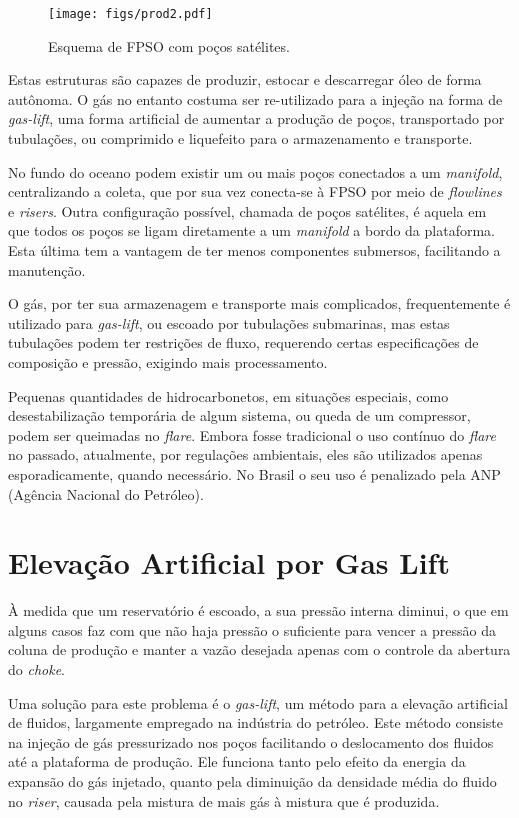 \begin{figure}
\centering
  \texttt{[image: figs/prod2.pdf]}
  \caption{Esquema de FPSO com poços satélites.}
  \label{fig:fpso1}
\end{figure}





Estas estruturas são capazes de produzir, estocar e descarregar óleo de forma autônoma. O gás no entanto costuma ser re-utilizado para a injeção na forma de \textit{gas-lift}, uma forma artificial de aumentar a produção de poços, transportado por tubulações, ou comprimido e liquefeito para o armazenamento e transporte.

No fundo do oceano podem existir um ou mais poços conectados a um \textit{manifold}, centralizando a coleta, que por sua vez conecta-se à FPSO por meio de \textit{flowlines} e \textit{risers}. Outra configuração possível, chamada de poços satélites, é aquela em que todos os poços se ligam diretamente a um \textit{manifold} a bordo da plataforma. Esta última tem a vantagem de ter menos componentes submersos, facilitando a manutenção.


O gás, por ter sua armazenagem e transporte mais complicados, frequentemente é utilizado para \textit{gas-lift}, ou escoado por tubulações submarinas, mas estas tubulações podem ter restrições de fluxo, requerendo certas especificações de composição e pressão, exigindo mais processamento.

Pequenas quantidades de hidrocarbonetos, em situações especiais, como desestabilização temporária de algum sistema, ou queda de um compressor, podem ser queimadas no \textit{flare}. Embora fosse tradicional o uso contínuo do \textit{flare} no passado, atualmente, por regulações ambientais, eles são utilizados apenas esporadicamente, quando necessário. No Brasil o seu uso é penalizado pela ANP (Agência Nacional do Petróleo).



\section{Elevação Artificial por Gas Lift}

À medida que um reservatório é escoado, a sua pressão interna diminui, o que em alguns casos faz com que não haja pressão o suficiente para vencer a pressão da coluna de produção e manter a vazão desejada  apenas com o controle da abertura do \textit{choke}.
%

Uma solução para este problema é o \textit{gas-lift}, um método para a elevação artificial de fluidos, largamente empregado na indústria do petróleo.
%
Este método consiste na injeção de gás pressurizado nos poços facilitando o deslocamento dos fluidos até a plataforma de produção. 
%
Ele funciona tanto pelo efeito da energia da expansão do gás injetado, quanto pela diminuição da densidade média do fluido no \textit{riser}, causada pela mistura de mais gás à mistura que é produzida.
%



